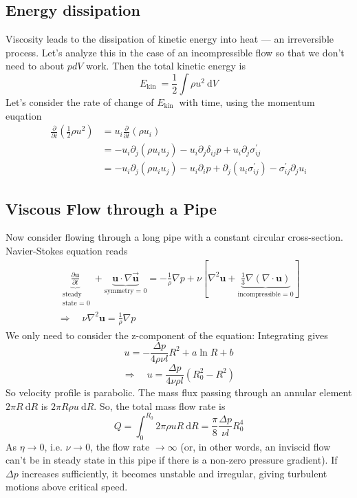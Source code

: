 \documentclass[12pt,a4paper]{article}
\begin{document}
\subsection{Energy dissipation}
Viscosity leads to the dissipation of kinetic energy into heat — an irreversible process.
Let's analyze this in the case of an incompressible flow so that we don't need to about $p d V$ work. Then the total kinetic energy is
$$
E_{\text {kin }}=\frac{1}{2} \int \rho u^2 \mathrm{~d} V
$$
Let's consider the rate of change of $E_{\text {kin }}$ with time, using the momentum euqation
$$
\begin{aligned}
\frac{\partial}{\partial t}\left(\frac{1}{2} \rho u^2\right) & =u_i \frac{\partial}{\partial t}\left(\rho u_i\right) \\
& =-u_i \partial_j\left(\rho u_i u_j\right)-u_i \partial_j \delta_{i j} p+u_i \partial_j \sigma_{i j}^{\prime} \\
& =-u_i \partial_j\left(\rho u_i u_j\right)-u_i \partial_i p+\partial_j\left(u_i \sigma_{i j}^{\prime}\right)-\sigma_{i j}^{\prime} \partial_j u_i
\end{aligned}
$$
\subsection{Viscous Flow through a Pipe}
Now consider flowing through a long pipe with a constant circular cross-section.
Navier-Stokes equation reads
$$
\begin{gathered}
\underbrace{\frac{\partial \mathbf{u}}{\partial t}}_{\begin{array}{c}
\text { steady } \\
\text { state = 0}
\end{array}}+\underbrace{\mathbf{u}\cdot\nabla \overrightarrow{\mathbf{u}}}_{\text {symmetry = 0}} =-\frac{1}{\rho} \nabla p+\nu[\nabla^2 \mathbf{u}+\underbrace{\frac{1}{3} \nabla(\nabla \cdot \mathbf{u})}_{\text {incompressible = 0}}] \\
\Rightarrow \quad \nu \nabla^2 \mathbf{u}=\frac{1}{\rho} \nabla p
\end{gathered}
$$
We only need to consider the z-component of the equation:
Integrating gives
$$
u=-\frac{\Delta p}{4 \rho \nu l} R^2+a \ln R+b
$$
$$
\Rightarrow \quad u=\frac{\Delta p}{4 \nu \rho l}\left(R_0^2-R^2\right)
$$
So velocity profile is parabolic.
The mass flux passing through an annular element $2 \pi R \mathrm{~d} R$ is $2 \pi R \rho u \mathrm{~d} R$. So, the total mass flow rate is
$$
Q=\int_0^{R_0} 2 \pi \rho u R \mathrm{~d} R=\frac{\pi}{8} \frac{\Delta p}{\nu l} R_0^4
$$
As $\eta \rightarrow 0$, i.e. $\nu \rightarrow 0$, the flow rate $\rightarrow \infty$ (or, in other words, an inviscid flow can't be in steady state in this pipe if there is a non-zero pressure gradient).
If $\Delta p$ increases sufficiently, it becomes unstable and irregular, giving turbulent motions above critical speed.
\end{document}
